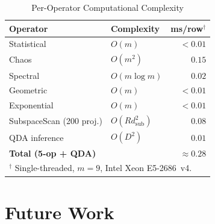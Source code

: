 \documentclass[journal]{IEEEtran}
\begin{document}
\begin{table}[!t]
\centering
\caption{Per-Operator Computational Complexity}
\label{tab:complexity}
\begin{tabular}{@{}llr@{}}
\toprule
\textbf{Operator} & \textbf{Complexity} & \textbf{ms/row}$^\dagger$ \\
\midrule
Statistical & $O(m)$ & $<0.01$ \\
Chaos & $O(m^2)$ & $0.15$ \\
Spectral & $O(m \log m)$ & $0.02$ \\
Geometric & $O(m)$ & $<0.01$ \\
Exponential & $O(m)$ & $<0.01$ \\
SubspaceScan (200 proj.) & $O(Rd_{\text{sub}}^2)$ & $0.08$ \\
QDA inference & $O(D^2)$ & $0.01$ \\
\midrule
\textbf{Total (5-op + QDA)} & & $\approx 0.28$ \\
\bottomrule
\multicolumn{3}{l}{\footnotesize $^\dagger$ Single-threaded, $m{=}9$, Intel Xeon E5-2686~v4.}
\end{tabular}
\end{table}



\section{Future Work}
\label{sec:future}
\end{document}
